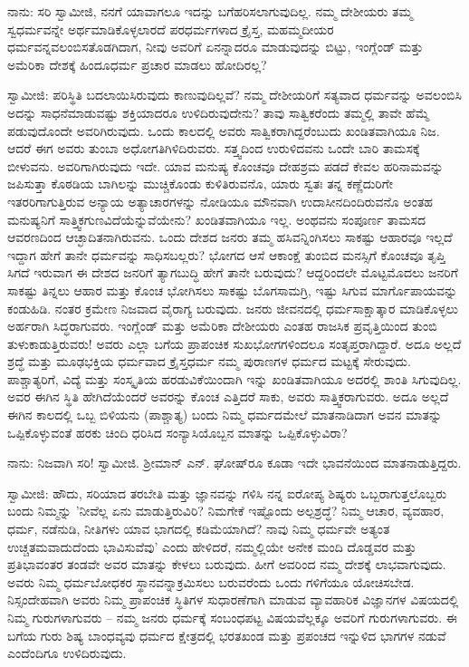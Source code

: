 ನಾನು: ಸರಿ ಸ್ವಾಮೀಜಿ, ನನಗೆ ಯಾವಾಗಲೂ ಇದನ್ನು ಬಗೆಹರಿಸಲಾಗುವುದಿಲ್ಲ. ನಮ್ಮ ದೇಶೀಯರು ತಮ್ಮ ಸ್ವಧರ್ಮವನ್ನೇ ಅರ್ಥಮಾಡಿಕೊಳ್ಳಲಾರದೆ ಪರಧರ್ಮಗಳಾದ ಕ್ರೈಸ್ತ, ಮಹಮ್ಮದೀಯರ ಧರ್ಮವನ್ನವಲಂಬಿಸತೊಡಗಿದಾಗ, ನೀವು ಅವರಿಗೆ ಏನನ್ನಾದರೂ ಮಾಡುವುದನ್ನು ಬಿಟ್ಟು, ಇಂಗ್ಲೆಂಡ್ ಮತ್ತು ಅಮೆರಿಕಾ ದೇಶಕ್ಕೆ ಹಿಂದೂಧರ್ಮ ಪ್ರಚಾರ ಮಾಡಲು ಹೋದಿರಲ್ಲ?

ಸ್ವಾಮೀಜಿ: ಪರಿಸ್ಥಿತಿ ಬದಲಾಯಿಸಿರುವುದು ಕಾಣುವುದಿಲ್ಲವೆ? ನಮ್ಮ ದೇಶೀಯರಿಗೆ ಸತ್ಯವಾದ ಧರ್ಮವನ್ನು ಅವಲಂಬಿಸಿ ಅದನ್ನು ಸಾಧನೆಮಾಡುವಷ್ಟು ಶಕ್ತಿಯಾದರೂ ಉಳಿದಿರುವುದೇನು? ತಾವು ಸಾತ್ವಿಕರೆಂದು ತಮ್ಮಲ್ಲಿ ತಾವೇ ಹೆಮ್ಮೆ ಪಡುವುದೊಂದೇ ಅವರಿಗಿರುವುದು. ಒಂದು ಕಾಲದಲ್ಲಿ ಅವರು ಸಾತ್ವಿಕರಾಗಿದ್ದರೆಂಬುದು ಖಂಡಿತವಾಗಿಯೂ ನಿಜ. ಆದರೆ ಈಗ ಅವರು ತುಂಬಾ ಅಧೋಗತಿಗಿಳಿದಿರುವರು. ಸತ್ತ್ವದಿಂದ ಉರುಳಿದವನು ಒಂದೇ ಬಾರಿ ತಾಮಸಕ್ಕೆ ಬೀಳುವನು. ಅವರಿಗಾಗಿರುವುದು ಇದೇ. ಯಾವ ಮನುಷ್ಯ ಕೊಂಚವೂ ದೇಹಶ್ರಮ ಪಡದೆ ಕೇವಲ ಹರಿನಾಮವನ್ನು ಜಪಿಸುತ್ತಾ ಕೊಠಡಿಯ ಬಾಗಿಲನ್ನು ಮುಚ್ಚಿಕೊಂಡು ಕುಳಿತಿರುವನೊ, ಯಾರು ಸ್ವತಃ ತನ್ನ ಕಣ್ಣೆದುರಿಗೇ ಇತರರಿಗಾಗುತ್ತಿರುವ ಅನ್ಯಾಯ ಅತ್ಯಾಚಾರಗಳನ್ನು ನೋಡಿಯೂ ಮೌನವಾಗಿ ಉದಾಸೀನದಿಂದಿರುವನೊ ಅಂತಹ ಮನುಷ್ಯನಿಗೆ ಸಾತ್ತ್ವಿಕಗುಣವಿದೆಯೆನ್ನುವೆಯೇನು? ಖಂಡಿತವಾಗಿಯೂ ಇಲ್ಲ. ಅಂಥವನು ಸಂಪೂರ್ಣ ತಾಮಸದ ಆವರಣದಿಂದ ಆಚ್ಛಾದಿತನಾಗಿರುವನು. ಒಂದು ದೇಶದ ಜನರು ತಮ್ಮ ಹಸಿವನ್ನಿಂಗಿಸಲು ಸಾಕಷ್ಟು ಆಹಾರವೂ ಇಲ್ಲದೆ ಇದ್ದಾಗ ಹೇಗೆ ತಾನೇ ಧರ್ಮವನ್ನು ಸಾಧಿಸಬಲ್ಲರು? ಭೋಗದ ಆಸೆ ಆಕಾಂಕ್ಷೆ ತುಂಬಿದ ಮನಸ್ಸಿಗೆ ಕೊಂಚವೂ ತೃಪ್ತಿ ಸಿಗದೆ ಇರುವಾಗ ಈ ದೇಶದ ಜನರಿಗೆ ತ್ಯಾಗಬುದ್ಧಿ ಹೇಗೆ ತಾನೇ ಬರುವುದು? ಆದ್ದರಿಂದಲೇ ಮೊಟ್ಟಮೊದಲು ಜನರಿಗೆ ಸಾಕಷ್ಟು ತಿನ್ನಲು ಆಹಾರ ಮತ್ತು ಕೊಂಚ ಭೋಗಿಸಲು ಸಾಕಷ್ಟು ಬೊಗಸಾಮಗ್ರಿ, ಇಷ್ಟು ಸಿಗುವ ಮಾರ್ಗೊಪಾಯವನ್ನು ಕಂಡುಹಿಡಿ. ನಂತರ ಕ್ರಮೇಣ ನಿಜವಾದ ವೈರಾಗ್ಯ ಬರುವುದು. ಜನರು ಜೀವನದಲ್ಲಿ ಧರ್ಮಸಾಕ್ಷಾತ್ಕಾರ ಮಾಡಿಕೊಳ್ಳಲು ಅರ್ಹರಾಗಿ ಸಿದ್ಧರಾಗುವರು. ಇಂಗ್ಲೆಂಡ್ ಮತ್ತು ಅಮೆರಿಕಾ ದೇಶೀಯರು ಎಂತಹ ರಾಜಸಿಕ ಪ್ರವೃತ್ತಿಯಿಂದ ತುಂಬಿ ತುಳುಕಾಡುತ್ತಿರುವರು! ಅವರು ಎಲ್ಲಾ ಬಗೆಯ ಪ್ರಾಪಂಚಿಕ ಸುಖಭೋಗಗಳಿಂದಲೂ ಸಂತೃಪ್ತರಾಗಿದ್ದಾರೆ. ಅದೂ ಅಲ್ಲದೆ ಶ್ರದ್ಧೆ ಮತ್ತು ಮೂಢಭಕ್ತಿಯ ಧರ್ಮವಾದ ಕ್ರೈಸ್ತಧರ್ಮ ನಮ್ಮ ಪುರಾಣಗಳ ಧರ್ಮದ ಮಟ್ಟಕ್ಕೆ ಸೇರುವುದು. ಪಾಶ್ಚಾತ್ಯರಿಗೆ, ವಿದ್ಯೆ ಮತ್ತು ಸಂಸ್ಕೃತಿಯ ಹರಡುವಿಕೆಯಿಂದಾಗಿ ಇನ್ನು ಖಂಡಿತವಾಗಿಯೂ ಅದರಲ್ಲಿ ಶಾಂತಿ ಸಿಗುವುದಿಲ್ಲ. ಅವರ ಈಗಿನ ಸ್ಥಿತಿ ಹೇಗಿದೆಯೆಂದರೆ ಅವರನ್ನು ಕೊಂಚ ಎತ್ತಿದರೆ ಸಾಕು, ಅವರು ಸಾತ್ತ್ವಿಕರಾಗುವರು. ಅದೂ ಅಲ್ಲದೆ ಈಗಿನ ಕಾಲದಲ್ಲಿ ಒಬ್ಬ ಬಿಳಿಯನು (ಪಾಶ್ಚಾತ್ಯ) ಬಂದು ನಿಮ್ಮ ಧರ್ಮದಮೇಲೆ ಮಾತನಾಡಿದಾಗ ಅವನ ಮಾತನ್ನು ಒಪ್ಪಿಕೊಳ್ಳುವಂತೆ ಹರಕು ಚಿಂದಿ ಧರಿಸಿದ ಸಂನ್ಯಾಸಿಯೊಬ್ಬನ ಮಾತನ್ನು ಒಪ್ಪಿಕೊಳ್ಳುವಿರಾ?

ನಾನು: ನಿಜವಾಗಿ ಸರಿ! ಸ್ವಾಮೀಜಿ. ಶ‍್ರೀಮಾನ್ ಎನ್. ಘೋಷ್‌ರೂ ಕೂಡಾ ಇದೇ ಭಾವನೆಯಿಂದ ಮಾತನಾಡುತ್ತಿದ್ದರು.

ಸ್ವಾಮೀಜಿ: ಹೌದು, ಸರಿಯಾದ ತರಬೇತಿ ಮತ್ತು ಜ್ಞಾನವನ್ನು ಗಳಿಸಿ ನನ್ನ ಐರೋಪ್ಯ ಶಿಷ್ಯರು ಒಬ್ಬರಾಗುತ್ತಲೊಬ್ಬರು ಬಂದು ನಿಮ್ಮನ್ನು 'ನೀವೆಲ್ಲ ಏನು ಮಾಡುತ್ತಿರುವಿರಿ? ನಿಮಗೇಕೆ ಇಷ್ಟೊಂದು ಅಲ್ಪಶ್ರದ್ಧೆ? ನಿಮ್ಮ ಆಚಾರ, ವ್ಯವಹಾರ, ಧರ್ಮ, ನಡೆನುಡಿ, ನೀತಿಗಳು ಯಾವ ಭಾಗದಲ್ಲಿ ಕಡಿಮೆಯಾಗಿದೆ? ನಾವು ನಿಮ್ಮ ಧರ್ಮವೇ ಅತ್ಯಂತ ಉಚ್ಚತಮವಾದುದೆಂದು ಭಾವಿಸುವೆವು' ಎಂದು ಹೇಳಿದರೆ, ನಮ್ಮಲ್ಲಿಯೇ ಅನೇಕ ಮಂದಿ ದೊಡ್ಡವರ ಮತ್ತು ಪ್ರತಿಭಾವಂತರ ತಂಡವೇ ಅವರ ಮಾತನ್ನು ಕೇಳಲು ಬರುವುದು. ಹೀಗೆ ಅವರಿಂದ ನಮ್ಮ ದೇಶಕ್ಕೆ ಲಾಭವಾಗುವುದು. ಅವರು ನಿಮ್ಮ ಧರ್ಮಬೋಧಕರ ಸ್ಥಾನವನ್ನಾಕ್ರಮಿಸಲು ಬರುವರೆಂದು ಒಂದು ಗಳಿಗೆಯೂ ಯೋಚಿಸಬೇಡ. ನಿಸ್ಸಂದೇಹವಾಗಿ ಅವರು ನಿಮ್ಮ ಪ್ರಾಪಂಚಿಕ ಸ್ಥಿತಿಗಳ ಸುಧಾರಣೆಗಾಗಿ ಮಾಡುವ ವ್ಯಾವಹಾರಿಕ ವಿಜ್ಞಾನಗಳ ವಿಷಯದಲ್ಲಿ ನಿಮ್ಮ ಗುರುಗಳಾಗುವರು – ನಮ್ಮ ಜನರು ಧರ್ಮಕ್ಕೆ ಸಂಬಂಧಪಟ್ಟ ವಿಷಯವೆಲ್ಲಕ್ಕೂ ಅವರಿಗೆ ಗುರುಗಳಾಗುವರು. ಈ ಬಗೆಯ ಗುರು ಶಿಷ್ಯ ಬಾಂಧವ್ಯವು ಧರ್ಮದ ಕ್ಷೇತ್ರದಲ್ಲಿ ಭರತಖಂಡ ಮತ್ತು ಪ್ರಪಂಚದ ಇನ್ನುಳಿದ ಭಾಗಗಳ ನಡುವೆ ಎಂದೆಂದಿಗೂ ಉಳಿದಿರುವುದು.

